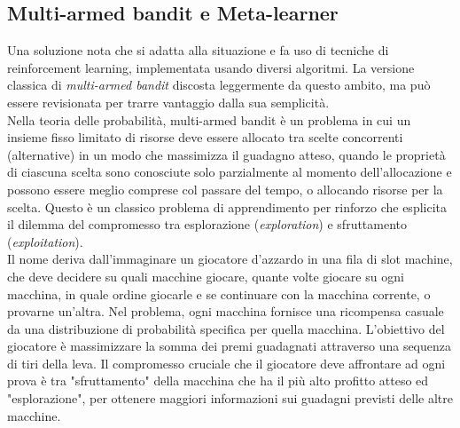 \documentclass[a4paper,12pt]{report}
\begin{document}
\begin{fig}
\subsection{Multi-armed bandit e Meta-learner}
Una soluzione nota che si adatta alla situazione e fa uso di tecniche di reinforcement learning, implementata usando diversi algoritmi. La versione classica di \textit{multi-armed bandit} discosta leggermente da questo ambito, ma può essere revisionata per trarre vantaggio dalla sua semplicità.\cite{rl}\\ Nella teoria delle probabilità, multi-armed bandit è un problema in cui un insieme fisso limitato di risorse deve essere allocato tra scelte concorrenti (alternative) in un modo che massimizza il guadagno atteso, quando le proprietà di ciascuna scelta sono conosciute solo parzialmente al momento dell'allocazione e possono essere meglio comprese col passare del tempo, o allocando risorse per la scelta. Questo è un classico problema di apprendimento per rinforzo che esplicita il dilemma del compromesso tra esplorazione (\textit{exploration}) e sfruttamento (\textit{exploitation}).\\ Il nome deriva dall'immaginare un giocatore d'azzardo in una fila di slot machine, che deve decidere su quali macchine giocare, quante volte giocare su ogni macchina, in quale ordine giocarle e se continuare con la macchina corrente, o provarne un'altra. Nel problema, ogni macchina fornisce una ricompensa casuale da una distribuzione di probabilità specifica per quella macchina. L'obiettivo del giocatore è massimizzare la somma dei premi guadagnati attraverso una sequenza di tiri della leva. Il compromesso cruciale che il giocatore deve affrontare ad ogni prova è tra "sfruttamento" della macchina che ha il più alto profitto atteso ed "esplorazione", per ottenere maggiori informazioni sui guadagni previsti delle altre macchine.



\end{fig}
\end{document}
